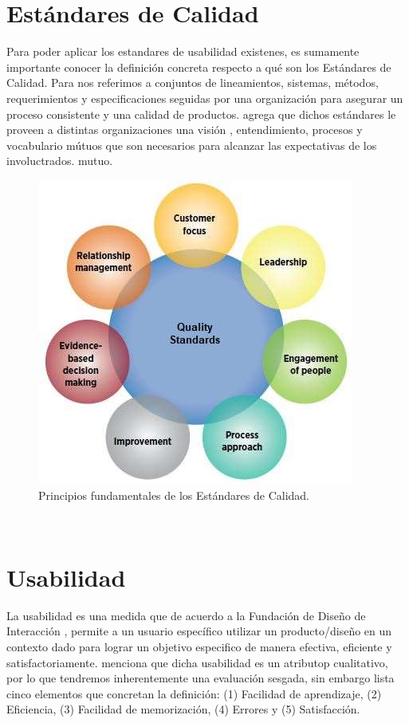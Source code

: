 \section{Estándares de Calidad}
Para poder aplicar los estandares de usabilidad existenes, es sumamente importante conocer la
definición concreta respecto a qué son los Estándares de Calidad. Para %
nos referimos a conjuntos de lineamientos, sistemas, métodos, requerimientos y especificaciones
seguidas por una organización para asegurar un proceso consistente y una calidad de productos.
agrega que dichos estándares le proveen a distintas organizaciones una visión , entendimiento,
procesos y vocabulario mútuos que son necesarios para alcanzar las expectativas de los involuctrados.
mutuo.
\begin{figure}[t]
    \centering
    \includegraphics[scale=0.4]{../images/images/fig1.JPG}
    \caption{Principios fundamentales de los Estándares de Calidad.}
    \label{fig:fig1}    
\end{figure}
\\

\section{Usabilidad}
La usabilidad es una medida que de acuerdo a la Fundación de Diseño de Interacción \cite{unknown-author-no-dateC}, %
permite a un usuario específico utilizar un producto/diseño en un contexto dado para lograr
un objetivo especifico de manera efectiva, eficiente y satisfactoriamente. \cite{unknown-author-no-dateB} menciona %
que dicha usabilidad es un atributop cualitativo, por lo que tendremos inherentemente una
evaluación sesgada, sin embargo lista cinco elementos que concretan la definición:
(1) Facilidad de aprendizaje, (2) Eficiencia, (3) Facilidad de memorización, (4) Errores 
y (5) Satisfacción.
\\

